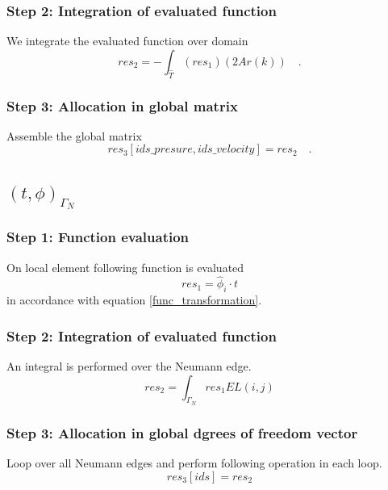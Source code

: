 \documentclass[a4paper,openany]{book}
\begin{document}
\subsubsection{Step 2: Integration of evaluated function}
We integrate the evaluated function over domain\\
\begin{equation}
res_2 = -\int_{\hat{T}} (res_1) (2 Ar(k)) \quad \textrm{.}
\end{equation}

\subsubsection{Step 3: Allocation in global matrix}

Assemble the global matrix\\
\begin{equation}
res_3[ids\_presure,ids\_velocity] = res_2 \quad \textrm{.}
\end{equation}

\subsection{$(t,\phi)_{\Gamma_N}$}

\subsubsection{Step 1: Function evaluation}

On local element following function is evaluated 
\begin{equation}
res_1=\hat{\phi}_i \cdot t
\end{equation} in accordance with equation \eqref{func_transformation}.

\subsubsection{Step 2: Integration of evaluated function}

An integral is performed over the Neumann edge. 
\begin{equation}
res_2=\int_{\Gamma_N} res_1 EL(i,j)
\end{equation}

\subsubsection{Step 3: Allocation in global dgrees of freedom vector}

Loop over all Neumann edges and perform following operation in each loop.
\begin{equation}
res_3[ids]=res_2
\end{equation}
\end{document}
